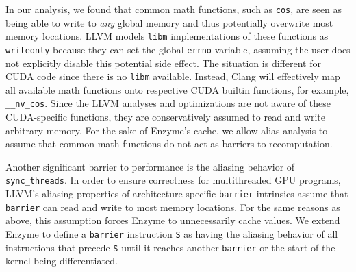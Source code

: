 In our analysis, we found that common math functions, such as \lstinline|cos|, are seen as being able to write to \emph{any} global memory and thus potentially overwrite most memory locations.
LLVM models \texttt{libm} implementations of these functions as \texttt{writeonly} because they can set the global \texttt{errno} variable, assuming the user does not explicitly disable this potential side effect.
The situation is different for CUDA code since there is no \texttt{libm} available.
Instead, Clang will effectively map all available math functions onto respective CUDA builtin functions, for example, \texttt{\_\_nv\_cos}.
Since the LLVM analyses and optimizations are not aware of these CUDA-specific functions, they are conservatively assumed to read and write arbitrary memory.
For the sake of Enzyme's cache,  we allow alias analysis to assume that common math functions do not act as barriers to recomputation.

Another significant barrier to performance is the aliasing behavior of \texttt{sync\_threads}. In order to ensure correctness for multithreaded GPU programs, LLVM's aliasing properties of architecture-specific \texttt{barrier} intrinsics assume that \texttt{barrier} can read and write to most memory locations. For the same reasons as above, this assumption forces Enzyme to unnecessarily cache values. We extend Enzyme to define a \texttt{barrier} instruction \texttt{S} as having the aliasing behavior of all instructions that precede \texttt{S} until it reaches another \texttt{barrier} or the start of the kernel being differentiated.


